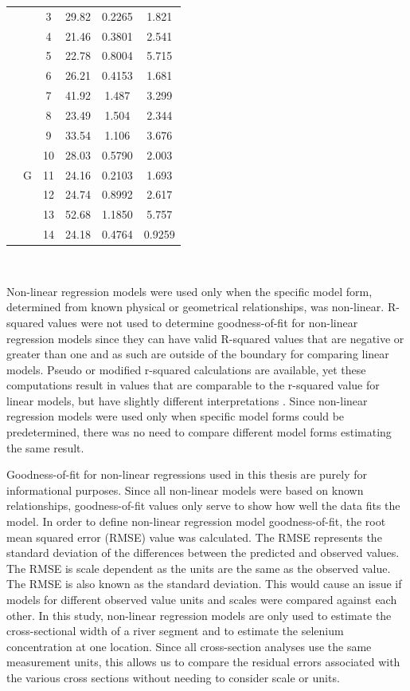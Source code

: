 \begin{linenumbers}
\begin{table}[htbp]
\begin{tabular}{cccccc}
		&						& 3 & 29.82 & 0.2265 & 1.821\\
		& 						& 4 & 21.46 & 0.3801 & 2.541\\
		&						& 5 & 22.78 & 0.8004 & 5.715\\
		&						& 6 & 26.21 & 0.4153 & 1.681\\
		&						& 7 & 41.92 & 1.487 & 3.299\\ \cmidrule(l{0.5em}r){2-6}
		& \multirow{7}[2]{*}{G} & 8 & 23.49 & 1.504 & 2.344\\
		&						& 9 & 33.54 & 1.106 & 3.676\\
		&						& 10& 28.03 & 0.5790 & 2.003\\
		&						& 11& 24.16 & 0.2103 & 1.693\\
		&						& 12& 24.74 & 0.8992 & 2.617\\
		&						& 13& 52.68 & 1.1850 & 5.757\\
		&						& 14& 24.18 & 0.4764 & 0.9259\\
		\bottomrule
	\end{tabular}\\
\end{table}

Non-linear regression models were used only when the specific model form, determined from known physical or geometrical relationships, was non-linear.  R-squared values were not used to determine goodness-of-fit for non-linear regression models since they can have valid R-squared values that are negative or greater than one \parencite{spiess2010} and as such are outside of the boundary for comparing linear models.  Pseudo or modified r-squared calculations are available, yet these computations result in values that are comparable to the r-squared value for linear models, but have slightly different interpretations .  Since non-linear regression models were used only when specific model forms could be predetermined, there was no need to compare different model forms estimating the same result.

Goodness-of-fit for non-linear regressions used in this thesis are purely for informational purposes.  Since all non-linear models were based on known relationships, goodness-of-fit values only serve to show how well the data fits the model.  In order to define non-linear regression model goodness-of-fit, the root mean squared error (RMSE) value was calculated.  The RMSE represents the standard deviation of the differences between the predicted and observed values.  The RMSE is scale dependent as the units are the same as the observed value.  The RMSE is also known as the standard deviation.  This would cause an issue if models for different observed value units and scales were compared against each other.  In this study, non-linear regression models are only used to estimate the cross-sectional width of a river segment and to estimate the selenium concentration at one location.  Since all cross-section analyses use the same measurement units, this allows us to compare the residual errors associated with the various cross sections without needing to consider scale or units.


\end{linenumbers}
